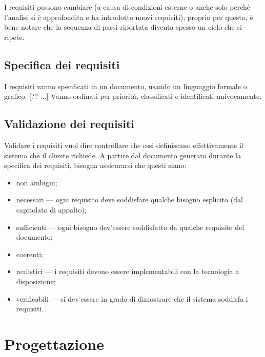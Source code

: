 \documentclass[a4paper]{article}
\begin{document}
		
I requisiti possono cambiare (a causa di condizioni esterne o anche solo perché l'analisi si è approfondita e ha introdotto nuovi requisiti); proprio per questo, è bene notare che la sequenza di passi riportata diventa spesso un ciclo che si ripete.

		
	\subsection{Specifica dei requisiti}

		
I requisiti vanno specificati in un documento, usando un linguaggio formale o grafico. [?? ...] Vanno ordinati per priorità, classificati e identificati univocamente.

		
	\subsection{Validazione dei requisiti}

		
Validare i requisiti vuol dire controllare che essi definiscano effettivamente il sistema che il cliente richiede. A partire dal documento generato durante la specifica dei requisiti, bisogna assicurarsi che questi siano:
		
	\begin{itemize}
		
			
	\item non ambigui;
			
	\item necessari --- ogni requisito deve soddisfare qualche bisogno esplicito (dal capitolato di appalto);
			
	\item sufficienti --- ogni bisogno dev'essere soddisfatto da qualche requisito del documento;
			
	\item coerenti;
			
	\item realistici --- i requisiti devono essere implementabili con la tecnologia a disposizione;
			
	\item verificabili --- si dev'essere in grado di dimostrare che il sistema soddisfa i requisiti.
		
	\end{itemize}

	


		
	\section{Progettazione}
\end{document}
